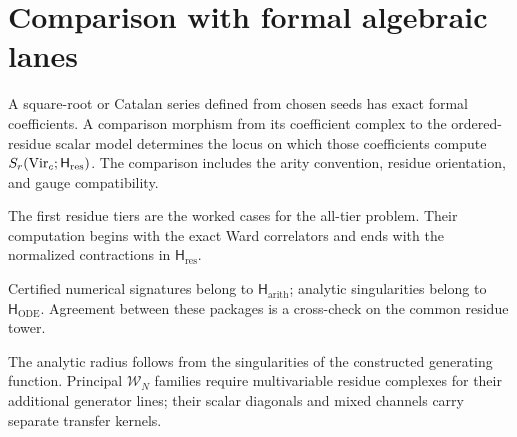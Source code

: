 \section{Comparison with formal algebraic lanes}

\begin{remark}
\label{rem:F-reduction-structure}
A square-root or Catalan series defined from chosen seeds has exact
formal coefficients.  A comparison morphism from its coefficient
complex to the ordered-residue scalar model determines the locus on
which those coefficients compute
\(S_r(\mathrm{Vir}_c;\mathsf H_{\mathrm{res}})\).
The comparison includes the arity convention, residue orientation,
and gauge compatibility.
\end{remark}

\begin{remark}
\label{rem:four-tier-recovery}
The first residue tiers are the worked cases for the all-tier
problem.  Their computation begins with the exact Ward correlators
and ends with the normalized contractions in
\(\mathsf H_{\mathrm{res}}\).
\end{remark}

\begin{remark}
\label{rem:tier-5-numerical-signature}
\label{rem:fuchsian-heun-comparison}
Certified numerical signatures belong to
\(\mathsf H_{\mathrm{arith}}\); analytic singularities belong to
\(\mathsf H_{\mathrm{ODE}}\).  Agreement between these packages is a
cross-check on the common residue tower.
\end{remark}

\begin{remark}
\label{rem:borel-analytic-continuation}
\label{rem:hypergeometric-contiguous-relation}
\label{rem:bivariate-generalisation-W-N}
The analytic radius follows from the singularities of the constructed
generating function.  Principal \(\mathcal W_N\) families require
multivariable residue complexes for their additional generator lines;
their scalar diagonals and mixed channels carry separate transfer
kernels.
\end{remark}

\label{eq:F-hyper}%
\label{eq:master-bilinear-proof}%
\label{eq:master-in-u}%
\label{eq:F-clear-denominator}%
\label{eq:tier-K-closed-form}%
\label{eq:F-sum-over-m}%
\label{eq:tier-5-explicit}%
\label{eq:fuchsian-ode}%
\label{eq:fuchsian-ode-expanded}%
\label{eq:fuchsian-sing-loci}%
\label{eq:gauss-ode-x}%
